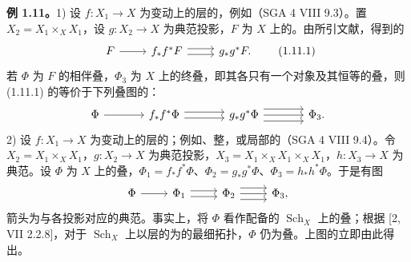 \textbf{例 1.11。}1) 设 $f:X_1\to X$ 为变动上的层的，例如（SGA 4 VIII 9.3）。置 $X_2=X_1\times_X X_1$，设 $g:X_2\to X$ 为典范投影，$F$ 为 $X$ 上的。由所引文献，得到的
\[
\begin{tikzcd}
F\arrow[r]&f_*f^*F\arrow[r,shift left=.6ex]\arrow[r,shift right=.6ex]&g_*g^*F.
\end{tikzcd}\tag{1.11.1}
\]
若 $\Phi$ 为 $F$ 的相伴叠，$\Phi_3$ 为 $X$ 上的终叠，即其各只有一个对象及其恒等的叠，则 (1.11.1) 的等价于下列叠图的：
\[
\begin{tikzcd}[column sep=large]
\Phi\arrow[r]&f_*f^*\Phi\arrow[r,shift left=.6ex]\arrow[r,shift right=.6ex]&g_*g^*\Phi\arrow[r,shift left=1.2ex]\arrow[r]\arrow[r,shift right=1.2ex]&\Phi_3.
\end{tikzcd}
\]
2) 设 $f:X_1\to X$ 为变动上的层的；例如、整，或局部的（SGA 4 VIII 9.4）。令 $X_2=X_1\times_X X_1$，$g:X_2\to X$ 为典范投影，$X_3=X_1\times_X X_1\times_X X_1$，$h:X_3\to X$ 为典范。设 $\Phi$ 为 $X$ 上的叠，$\Phi_1=f_*f^*\Phi$、$\Phi_2=g_*g^*\Phi$、$\Phi_3=h_*h^*\Phi$。于是有图
\[
\begin{tikzcd}
\Phi\arrow[r]&\Phi_1\arrow[r,shift left=.6ex]\arrow[r,shift right=.6ex]&\Phi_2\arrow[r,shift left=1.2ex]\arrow[r]\arrow[r,shift right=1.2ex]&\Phi_3,
\end{tikzcd}
\]
箭头为与各投影对应的典范。事实上，将 $\Phi$ 看作配备的 $\operatorname{Sch}_X$ 上的叠；根据 [2, VII 2.2.8]，对于 $\operatorname{Sch}_X$ 上以层的为的最细拓扑，$\Phi$ 仍为叠。上图的立即由此得出。

